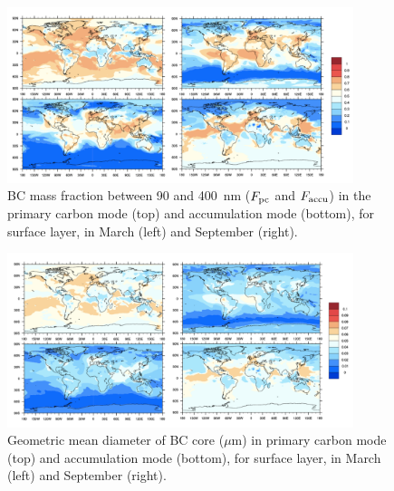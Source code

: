 \documentclass[12pt, fullpage]{uiucthesis2009_2}
\begin{document}
	\begin{figure}[h] 
		\begin{center}
			\includegraphics[width = 0.9\textwidth]{Rplot02}
			\caption[BC mass fraction between 90 and 400~nm ($F_{\rm pc}$ and $F_{\rm accu}$) in the primary carbon mode (top) and accumulation mode (bottom), for surface layer, in March and September]{\label{fig_R5} BC mass fraction between 90 and 400~nm ($F_{\rm pc}$ and $F_{\rm accu}$) in the primary carbon mode (top) and accumulation mode (bottom), for surface layer, in March (left) and September (right).}
		\end{center}
	\end{figure}
	
	\begin{figure}[h] 
		\begin{center}
			\includegraphics[width = 0.9\textwidth]{Rplot03}
			\caption[Geometric mean diameter of BC core ($\mu$m) in primary carbon mode (top) and accumulation mode (bottom), for surface layer, in March and September]{\label{fig_R6} Geometric mean diameter of BC core ($\mu$m) in primary carbon mode (top) and accumulation mode (bottom), for surface layer, in March (left) and September (right).}
		\end{center}
	\end{figure}
	
	
	
\end{document}

